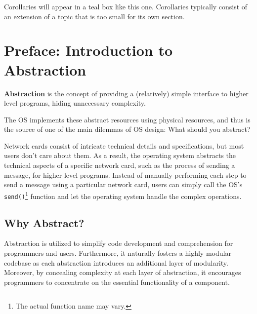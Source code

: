 \documentclass{report}
\begin{document}
\begin{tcolorbox}[colback=teal!5!white,colframe=black!75!teal,title=Corollaries]
  Corollaries will appear in a teal box like this one. Corollaries typically consist of an extension
  of a topic that is too small for its own section.
\end{tcolorbox}








\chapter*{Preface: Introduction to Abstraction}
\begin{tcolorbox}[title=Definition: Abstraction]
  \textbf{Abstraction} is the concept of providing a (relatively) simple interface to higher level
  programs, hiding unnecessary complexity.
\end{tcolorbox}

The OS implements these abstract resources using physical resources, and thus is the source of one
of the main dilemmas of OS design: What should you abstract?

\begin{tcolorbox}[colback=blue!5!white,colframe=black!75!blue,title=Example: Network Neverland]
  Network cards consist of intricate technical details and specifications, but most users don't care
  about them. As a result, the operating system abstracts the technical aspects of a
  specific network card, such as the process of sending a message, for higher-level programs. Instead
  of manually performing each step to send a message using a particular network card, users can simply
  call the OS's \texttt{send()}\footnote{The actual function name may vary.} function and let the
  operating system handle the complex operations. 
\end{tcolorbox}





\section*{Why Abstract?}
Abstraction is utilized to simplify code development and comprehension for programmers and
users. Furthermore, it naturally fosters a highly modular codebase as each abstraction introduces an
additional layer of modularity. Moreover, by concealing complexity at each layer of abstraction, it
encourages programmers to concentrate on the essential functionality of a component. 
\end{document}
